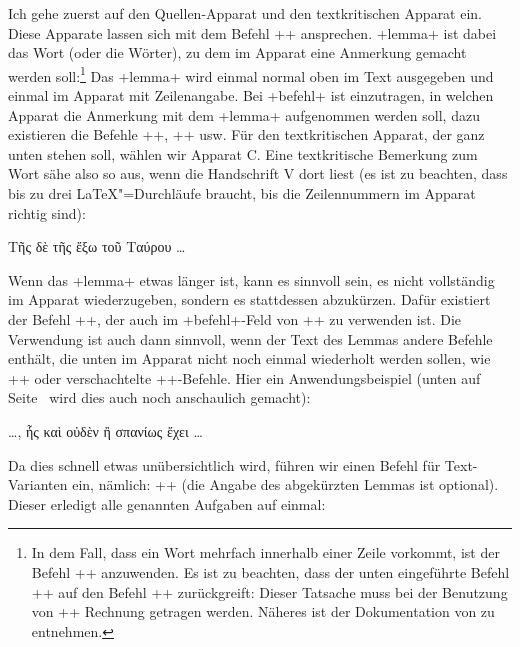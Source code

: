 Ich gehe zuerst auf den Quellen-Apparat und den textkritischen Apparat ein. Diese Apparate lassen sich 
mit dem Befehl ++ ansprechen. +lemma+ ist dabei das Wort (oder die Wörter), 
zu dem im Apparat eine Anmerkung gemacht werden soll:\footnote{In dem Fall, dass ein Wort mehrfach 
innerhalb einer Zeile vorkommt, ist der Befehl ++ anzuwenden. Es ist zu beachten, dass 
der unten eingeführte Befehl +\vari+ auf den Befehl +\lemma+ zurückgreift: Dieser Tatsache muss 
bei der Benutzung von +\sameword+ Rechnung getragen werden. Näheres ist der Dokumentation von 
\reledmac zu entnehmen.} Das +lemma+ wird einmal normal oben im Text ausgegeben und einmal im Apparat mit Zeilenangabe. Bei +befehl+ ist einzutragen, 
in welchen Apparat die Anmerkung mit 
dem +lemma+ aufgenommen werden soll, 
dazu existieren die Befehle ++, ++ usw. Für den textkritischen Apparat, der ganz unten stehen soll, wählen wir Apparat C. Eine textkritische Bemerkung zum Wort  sähe also so aus, wenn die Handschrift V dort  liest 
(es ist zu beachten, dass \reledmac bis zu drei \LaTeX"=Durchläufe braucht, bis die Zeilennummern im Apparat richtig sind):

\begin{lfgwcode}{}
Τῆς  δὲ τῆς ἔξω τοῦ Ταύρου \dots{}
\end{lfgwcode}

Wenn das +lemma+ etwas länger ist, kann es sinnvoll sein, es nicht vollständig im Apparat wiederzugeben, sondern es
stattdessen abzukürzen. 
Dafür existiert der Befehl ++, der auch im +befehl+-Feld von +\edtext+ zu verwenden ist.
Die Verwendung ist auch dann sinnvoll, wenn der Text des Lemmas andere Befehle enthält, die unten im Apparat nicht noch einmal wiederholt werden sollen, wie +\alteSeite+ oder verschachtelte +\edtext+-Befehle.
Hier ein Anwendungsbeispiel (unten auf Seite~\pageref{Pilhofer-Beispiel-Lemma-kurz} wird dies auch noch anschaulich gemacht):

\begin{lfgwcode}{}
\dots{}, ἧς  καὶ οὐδὲν ἢ σπανίως ἔχει \dots{}
\end{lfgwcode}

Da dies schnell etwas unübersichtlich wird, führen wir einen Befehl für Text-Varianten ein, 
nämlich: ++ (die Angabe des abgekürzten Lemmas ist optional). Dieser erledigt alle genannten Aufgaben auf einmal:


